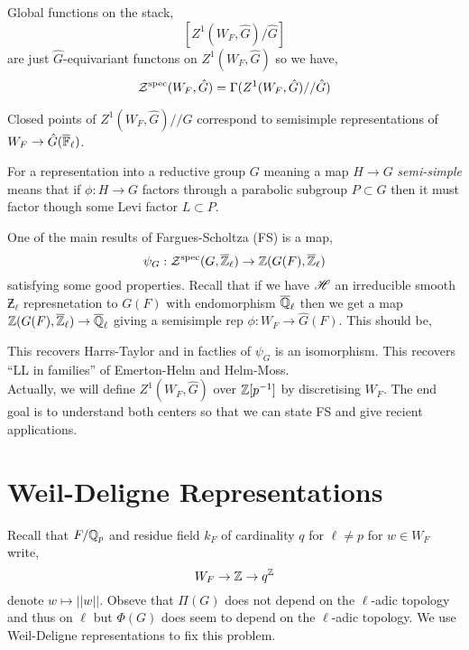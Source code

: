 \documentclass[12pt]{article}
\begin{document}
Global functions on the stack,
\[ [Z^1(W_F, \hat{G}) / \hat{G} ] \]
are just $\hat{G}$-equivariant functons on $Z^1(W_F, \hat{G})$ so we have,
\[ \mathcal{Z}^{\mathrm{spec}}(W_F, \hat{G}) = \Gamma(Z^1(W_F, \hat{G}) // \hat{G}) \]

\begin{thm}
Closed points of $Z^1(W_F, \hat{G}) // \hat{G}$ correspond to semisimple representations of $W_F \to \hat{G}(\overline{\mathbb{F}}_\ell)$. 
\end{thm}

\begin{defn}
For a representation into a reductive group $G$ meaning a map $H \to G$ \textit{semi-simple} means that if $\phi : H \to G$ factors through a parabolic subgroup $P \subset G$ then it must factor though some Levi factor $L \subset P$. 
\end{defn}

One of the main results of Fargues-Scholtza (FS) is a map,
\[ \psi_G : \mathcal{Z}^{\mathrm{spec}}(G, \overline{\mathbb{Z}}_\ell) \to \mathbb{Z}(G(F), \overline{\mathbb{Z}}_\ell) \]
satisfying some good properties. Recall that if we have $\mathscr{H}$ an irreducible smooth $\Zbar_\ell$ represnetation to $G(F)$ with endomorphism $\overline{\mathbb{Q}}_\ell$ then we get a map $\mathbb{Z}(G(F), \overline{\mathbb{Z}}_\ell) \to \overline{\mathbb{Q}}_\ell$ giving a semisimple rep $\phi : W_F \to \hat{G}(F)$. This should be,
\begin{center}
\end{center}
This recovers Harrs-Taylor and in factlies of  $\psi_G$ is an isomorphism. This recovers ``LL in families'' of Emerton-Helm and Helm-Moss. 
\bigskip\\
Actually, we will define $Z^1(W_F, \hat{G})$ over $\mathbb{Z}[p^{-1}]$ by discretising $W_F$. The end goal is to understand both centers so that we can state FS and give recient applications.

\section{Weil-Deligne Representations}

Recall that $F / \mathbb{Q}_p$ and residue field $k_F$ of cardinality $q$ for $\ell \neq p$ for $w \in W_F$ write,
\[ W_F \to \mathbb{Z} \to q^{\mathbb{Z}} \]
denote $w \mapsto || w ||$. Obseve that $\Pi(G)$ does not depend on the $\ell$-adic topology and thus on $\ell$ but $\Phi(G)$ does seem to depend on the $\ell$-adic topology. We use Weil-Deligne representations to fix this problem.
\end{document}
